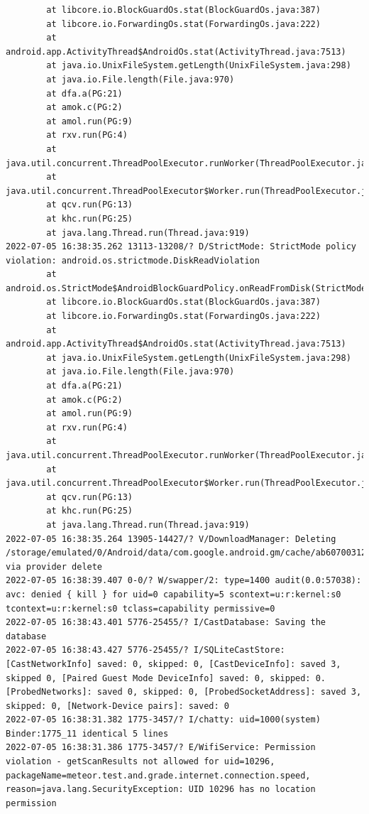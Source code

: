 \documentclass[a4paper,12pt]{book}
\begin{document}
\begin{lstlisting}
        at libcore.io.BlockGuardOs.stat(BlockGuardOs.java:387)
        at libcore.io.ForwardingOs.stat(ForwardingOs.java:222)
        at android.app.ActivityThread$AndroidOs.stat(ActivityThread.java:7513)
        at java.io.UnixFileSystem.getLength(UnixFileSystem.java:298)
        at java.io.File.length(File.java:970)
        at dfa.a(PG:21)
        at amok.c(PG:2)
        at amol.run(PG:9)
        at rxv.run(PG:4)
        at java.util.concurrent.ThreadPoolExecutor.runWorker(ThreadPoolExecutor.java:1167)
        at java.util.concurrent.ThreadPoolExecutor$Worker.run(ThreadPoolExecutor.java:641)
        at qcv.run(PG:13)
        at khc.run(PG:25)
        at java.lang.Thread.run(Thread.java:919)
2022-07-05 16:38:35.262 13113-13208/? D/StrictMode: StrictMode policy violation: android.os.strictmode.DiskReadViolation
        at android.os.StrictMode$AndroidBlockGuardPolicy.onReadFromDisk(StrictMode.java:1571)
        at libcore.io.BlockGuardOs.stat(BlockGuardOs.java:387)
        at libcore.io.ForwardingOs.stat(ForwardingOs.java:222)
        at android.app.ActivityThread$AndroidOs.stat(ActivityThread.java:7513)
        at java.io.UnixFileSystem.getLength(UnixFileSystem.java:298)
        at java.io.File.length(File.java:970)
        at dfa.a(PG:21)
        at amok.c(PG:2)
        at amol.run(PG:9)
        at rxv.run(PG:4)
        at java.util.concurrent.ThreadPoolExecutor.runWorker(ThreadPoolExecutor.java:1167)
        at java.util.concurrent.ThreadPoolExecutor$Worker.run(ThreadPoolExecutor.java:641)
        at qcv.run(PG:13)
        at khc.run(PG:25)
        at java.lang.Thread.run(Thread.java:919)
2022-07-05 16:38:35.264 13905-14427/? V/DownloadManager: Deleting /storage/emulated/0/Android/data/com.google.android.gm/cache/ab607003128b9b851d85327d2b425283 via provider delete
2022-07-05 16:38:39.407 0-0/? W/swapper/2: type=1400 audit(0.0:57038): avc: denied { kill } for uid=0 capability=5 scontext=u:r:kernel:s0 tcontext=u:r:kernel:s0 tclass=capability permissive=0
2022-07-05 16:38:43.401 5776-25455/? I/CastDatabase: Saving the database
2022-07-05 16:38:43.427 5776-25455/? I/SQLiteCastStore: [CastNetworkInfo] saved: 0, skipped: 0, [CastDeviceInfo]: saved 3, skipped 0, [Paired Guest Mode DeviceInfo] saved: 0, skipped: 0. [ProbedNetworks]: saved 0, skipped: 0, [ProbedSocketAddress]: saved 3, skipped: 0, [Network-Device pairs]: saved: 0
2022-07-05 16:38:31.382 1775-3457/? I/chatty: uid=1000(system) Binder:1775_11 identical 5 lines
2022-07-05 16:38:31.386 1775-3457/? E/WifiService: Permission violation - getScanResults not allowed for uid=10296, packageName=meteor.test.and.grade.internet.connection.speed, reason=java.lang.SecurityException: UID 10296 has no location permission

\end{lstlisting}
\end{document}
